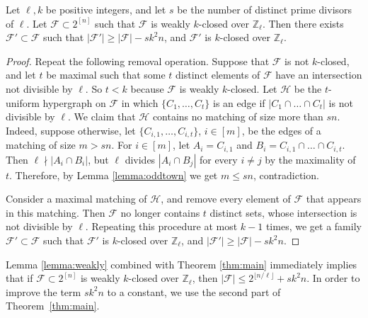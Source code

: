 	\begin{lemma}\label{lemma:weakly}
		Let $\ell,k$ be positive integers, and let $s$ be the number of distinct prime divisors of $\ell$. Let $\mathcal{F}\subset 2^{[n]}$ such that $\mathcal{F}$ is weakly $k$-closed over $\mathbb{Z}_{\ell}$.  Then there exists $\mathcal{F}'\subset \mathcal{F}$ such that $|\mathcal{F}'|\geq |\mathcal{F}|-sk^2n$, and $\mathcal{F}'$ is $k$-closed over $\mathbb{Z}_{\ell}$. 
	\end{lemma}
	
	\begin{proof}
		Repeat the following removal operation. Suppose that $\mathcal{F}$ is not $k$-closed, and let $t$ be maximal such that some $t$ distinct elements of $\mathcal{F}$ have an intersection not divisible by $\ell$. So $t < k$ because $\mathcal{F}$ is weakly $k$-closed. Let $\mathcal{H}$ be the $t$-uniform hypergraph on $\mathcal{F}$ in which $\{C_{1},\dots,C_{t}\}$ is an edge if $|C_1\cap\dots\cap C_t|$ is not divisible by $\ell$. We claim that $\mathcal{H}$ contains no matching of size more than $sn$. Indeed, suppose otherwise, let $\{C_{i,1},\dots,C_{i,t}\}$, $i\in [m]$, be the edges of a matching of size $m>sn$. For $i\in [m]$, let $A_{i}=C_{i,1}$ and $B_{i}=C_{i,1}\cap\dots\cap C_{i,t}$. Then $\ell\nmid|A_{i}\cap B_{i}|$, but $\ell$ divides $|A_i\cap B_j|$ for every $i\neq j$ by the maximality of $t$. Therefore, by Lemma \ref{lemma:oddtown} we get $m\leq sn$, contradiction.
		
		Consider a maximal matching of $\mathcal{H}$, and remove every element of $\mathcal{F}$ that appears in this matching. Then $\mathcal{F}$ no longer contains $t$ distinct sets, whose intersection is not divisible by $\ell$. Repeating this procedure at most $k-1$ times, we get a family $\mathcal{F}'\subset \mathcal{F}$ such that $\mathcal{F}'$ is $k$-closed over $\mathbb{Z}_{\ell}$, and $|\mathcal{F}'|\geq |\mathcal{F}|-sk^2n$.
	\end{proof}
	
	Lemma \ref{lemma:weakly} combined with Theorem \ref{thm:main} immediately implies that if $\mathcal{F}\subset 2^{[n]}$ is weakly $k$-closed over $\mathbb{Z}_{\ell}$, then $|\mathcal{F}|\leq 2^{\lfloor n/\ell\rfloor}+sk^2n$. In order to improve the term $sk^2n$ to a constant, we use the second part of Theorem~\ref{thm:main}.
	
